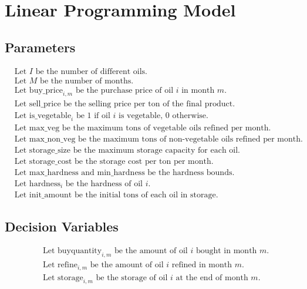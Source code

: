 \documentclass{article}
\begin{document}
\section*{Linear Programming Model}

\subsection*{Parameters}
\begin{align*}
&\text{Let } I \text{ be the number of different oils.} \\
&\text{Let } M \text{ be the number of months.} \\
&\text{Let } \text{buy\_price}_{i,m} \text{ be the purchase price of oil } i \text{ in month } m. \\
&\text{Let } \text{sell\_price} \text{ be the selling price per ton of the final product.} \\
&\text{Let } \text{is\_vegetable}_{i} \text{ be 1 if oil } i \text{ is vegetable, 0 otherwise.} \\
&\text{Let } \text{max\_veg} \text{ be the maximum tons of vegetable oils refined per month.} \\
&\text{Let } \text{max\_non\_veg} \text{ be the maximum tons of non-vegetable oils refined per month.} \\
&\text{Let } \text{storage\_size} \text{ be the maximum storage capacity for each oil.} \\
&\text{Let } \text{storage\_cost} \text{ be the storage cost per ton per month.} \\
&\text{Let } \text{max\_hardness} \text{ and } \text{min\_hardness} \text{ be the hardness bounds.} \\
&\text{Let } \text{hardness}_{i} \text{ be the hardness of oil } i. \\
&\text{Let } \text{init\_amount} \text{ be the initial tons of each oil in storage.}
\end{align*}

\subsection*{Decision Variables}
\begin{align*}
&\text{Let } \text{buyquantity}_{i, m} \text{ be the amount of oil } i \text{ bought in month } m. \\
&\text{Let } \text{refine}_{i, m} \text{ be the amount of oil } i \text{ refined in month } m. \\
&\text{Let } \text{storage}_{i, m} \text{ be the storage of oil } i \text{ at the end of month } m. \\
\end{align*}
\end{document}

